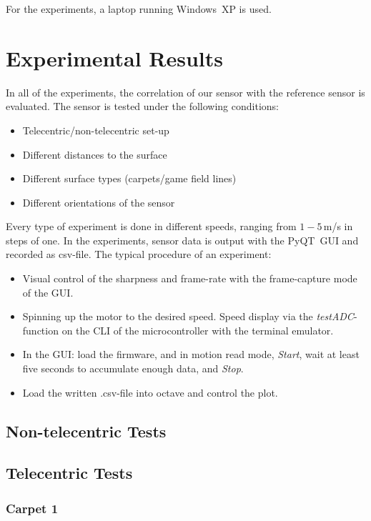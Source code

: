 \documentclass[12pt,a4paper]{article}
\begin{document}
For the experiments, a laptop running Windows~XP is used.


\clearpage
\section{Experimental Results}
\label{exp}

In all of the experiments, the correlation of our sensor with the reference sensor is evaluated.
The sensor is tested under the following conditions:

\begin{itemize}
 \item Telecentric/non-telecentric set-up
 \item Different distances to the surface
 \item Different surface types (carpets/game field lines)
 \item Different orientations of the sensor
\end{itemize}

Every type of experiment is done in different speeds, ranging from $1-5$\,m/s in steps of one.
In the experiments, sensor data is output with the PyQT~GUI and recorded as csv-file.
The typical procedure of an experiment: 
\begin{itemize}
 \item Visual control of the sharpness and frame-rate with the frame-capture mode of the GUI.
 \item Spinning up the motor to the desired speed. Speed display via the \emph{testADC}-function on the CLI of the microcontroller with the terminal emulator.
 \item In the GUI: load the firmware, and in motion read mode, \emph{Start}, wait at least five seconds to accumulate enough data, and \emph{Stop}.
 \item Load the written .csv-file into octave and control the plot.
\end{itemize}


\subsection{Non-telecentric Tests}

\subsection{Telecentric Tests}

\subsubsection{Carpet 1}
\end{document}
